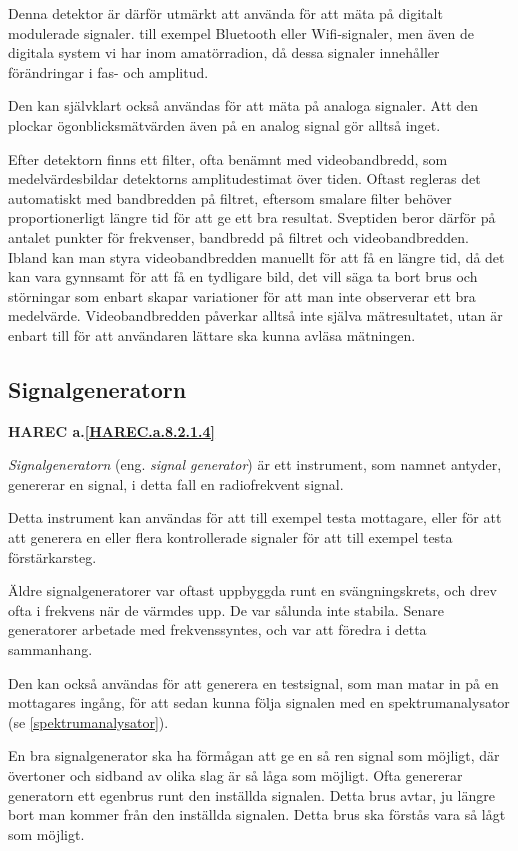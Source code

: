 Denna detektor är därför utmärkt att använda för att mäta på digitalt
modulerade signaler. till exempel Bluetooth eller Wifi-signaler, men även de digitala
system vi har inom amatörradion, då dessa signaler innehåller förändringar i
fas- och amplitud.

Den kan självklart också användas för att mäta på analoga signaler.
Att den plockar ögonblicksmätvärden även på en analog signal gör alltså inget.

Efter detektorn finns ett filter, ofta benämnt med videobandbredd, som
medelvärdesbildar detektorns amplitudestimat över tiden.
Oftast regleras det automatiskt med bandbredden på filtret, eftersom smalare
filter behöver proportionerligt längre tid för att ge ett bra resultat.
Sveptiden beror därför på antalet punkter för frekvenser, bandbredd på filtret
och videobandbredden.
Ibland kan man styra videobandbredden manuellt för att få en längre tid, då
det kan vara gynnsamt för att få en tydligare bild, det vill säga ta bort brus
och störningar som enbart skapar variationer för att man inte observerar ett bra
medelvärde.
Videobandbredden påverkar alltså inte själva mätresultatet, utan är enbart till
för att användaren lättare ska kunna avläsa mätningen.

\subsection{Signalgeneratorn}
\textbf{
HAREC a.\ref{HAREC.a.8.2.1.4}\label{myHAREC.a.8.2.1.4}
}

\emph{Signalgeneratorn} (eng. \emph{signal generator}) är ett instrument, som
namnet antyder, genererar en signal, i detta fall en radiofrekvent signal.

Detta instrument kan användas för att till exempel testa mottagare, eller för att att
generera en eller flera kontrollerade signaler för att till exempel testa
förstärkarsteg.

Äldre signalgeneratorer var oftast uppbyggda runt en svängningskrets, och drev
ofta i frekvens när de värmdes upp.
De var sålunda inte stabila.
Senare generatorer arbetade med frekvenssyntes, och var att föredra i detta
sammanhang.

Den kan också användas för att generera en testsignal, som man matar in på en
mottagares ingång, för att sedan kunna följa signalen med en spektrumanalysator
(se \ref{spektrumanalysator}).

En bra signalgenerator ska ha förmågan att ge en så ren signal som möjligt,
där övertoner och sidband av olika slag är så låga som möjligt.
Ofta genererar generatorn ett egenbrus runt den inställda signalen.
Detta brus avtar, ju längre bort man kommer från den inställda signalen.
Detta brus ska förstås vara så lågt som möjligt.

